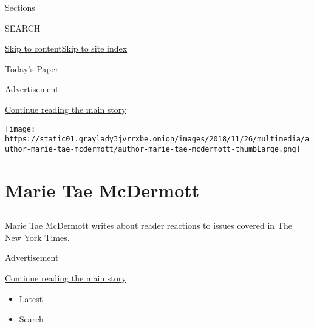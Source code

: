 Sections

SEARCH

\protect\hyperlink{site-content}{Skip to
content}\protect\hyperlink{site-index}{Skip to site index}

\href{https://myaccount.nytimes3xbfgragh.onion/auth/login?response_type=cookie\&client_id=vi}{}

\href{https://www.nytimes3xbfgragh.onion/section/todayspaper}{Today's
Paper}

Advertisement

\protect\hyperlink{after-top}{Continue reading the main story}

\texttt{[image: https://static01.graylady3jvrrxbe.onion/images/2018/11/26/multimedia/author-marie-tae-mcdermott/author-marie-tae-mcdermott-thumbLarge.png]}

\hypertarget{marie-tae-mcdermott}{%
\section{Marie Tae McDermott}\label{marie-tae-mcdermott}}

\subsection{}

Marie Tae McDermott writes about reader reactions to issues covered in
The New York Times.

Advertisement

\protect\hyperlink{after-mid1}{Continue reading the main story}

\begin{itemize}
\tightlist
\item
  \protect\hyperlink{stream-panel}{Latest}
\item
  Search
\end{itemize}

